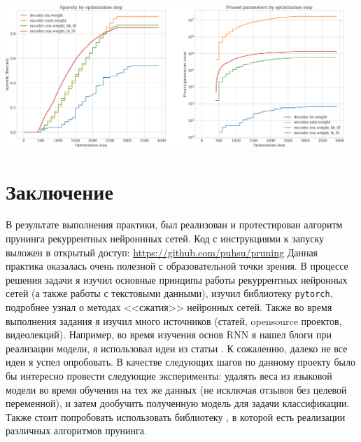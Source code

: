 \documentclass[12pt]{article}
\begin{document}
\begin{center}
  \includegraphics[width=0.96\textwidth]{results}
\end{center}

\section*{Заключение}
%
В результате выполнения практики, был реализован и протестирован алгоритм прунинга рекуррентных нейроннных сетей. 
Код с инструкциями к запуску выложен в открытый доступ: \url{https://github.com/puhsu/pruning}
Данная практика оказалась очень полезной с образовательной точки зрения. В процессе 
решения задачи я изучил основные принципы работы рекуррентных нейронных сетей (а также 
работы с текстовыми данными), изучил библиотеку \texttt{pytorch}, подробнее узнал о методах 
<<сжатия>> нейронных сетей. Также во время выполнения задания я изучил много источников 
(статей, opensource проектов, видеолекций). Например, во время изучения основ RNN я нашел 
блоги \cite{colah, karpathy} при реализации модели, я использовал 
идеи из статьи \cite{DBLP:journals/corr/abs-1801-06146}. К сожалению, далеко 
не все идеи я успел опробовать. В качестве следующих шагов по данному проекту было бы интересно
провести следующие эксперименты: удалять веса из языковой модели во время 
обучения на тех же данных (не исключая отзывов без целевой переменной), и затем дообучить полученную
модель для задачи классификации. Также стоит попробовать использовать библиотеку \cite{neta_zmora_2018_1297430}, в которой 
есть реализации различных алгоритмов прунинга.

\newpage

\nocite{*}
\printbibliography[title={Список используемых источников}]
\end{document}
